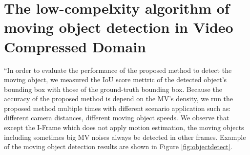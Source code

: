 \section{The low-compelxity algorithm of moving object detection in Video Compressed Domain}
“In order to evaluate the performance of the proposed method to detect the moving object, we measured the IoU score mettric of the detected object's bounding box with those of the ground-truth bounding box. Because the accuracy of the proposed method is depend on the MV's density, we run the proposed method multiple times with different scenario application such as: different camera distances, different moving object speeds. We observe that except the I-Frame which does not apply motion estimation, the moving objects including sometimes big MV noises always be detected in other frames. Example of the moving object detection results  are shown in Figure \ref{fig:objectdetect}. 
